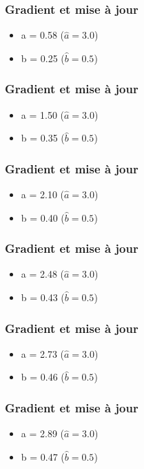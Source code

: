 \begin{frame}
  \frametitle{Gradient et mise à jour}
  \begin{itemize}
  \item a = 0.58 ($\hat{a} = 3.0$)
  \item b = 0.25 ($\hat{b} = 0.5$)
  \end{itemize}
\end{frame}

\begin{frame}
  \frametitle{Gradient et mise à jour}
  \begin{itemize}
  \item a = 1.50 ($\hat{a} = 3.0$)
  \item b = 0.35 ($\hat{b} = 0.5$)
  \end{itemize}
\end{frame}

\begin{frame}
  \frametitle{Gradient et mise à jour}
  \begin{itemize}
  \item a = 2.10 ($\hat{a} = 3.0$)
  \item b = 0.40 ($\hat{b} = 0.5$)
  \end{itemize}
\end{frame}

\begin{frame}
  \frametitle{Gradient et mise à jour}
  \begin{itemize}
  \item a = 2.48 ($\hat{a} = 3.0$)
  \item b = 0.43 ($\hat{b} = 0.5$)
  \end{itemize}
\end{frame}

\begin{frame}
  \frametitle{Gradient et mise à jour}
  \begin{itemize}
  \item a = 2.73 ($\hat{a} = 3.0$)
  \item b = 0.46 ($\hat{b} = 0.5$)
  \end{itemize}
\end{frame}

\begin{frame}
  \frametitle{Gradient et mise à jour}
  \begin{itemize}
  \item a = 2.89 ($\hat{a} = 3.0$)
  \item b = 0.47 ($\hat{b} = 0.5$)
  \end{itemize}
\end{frame}

